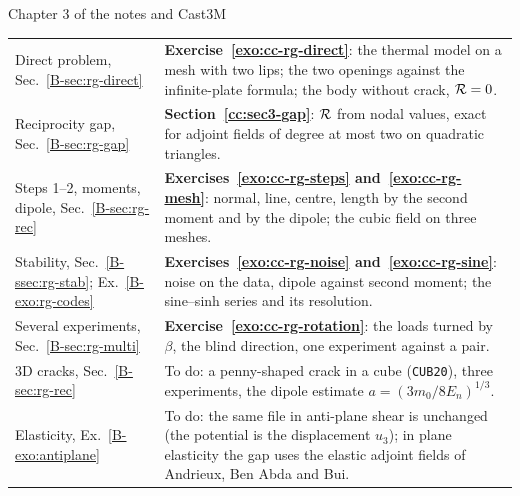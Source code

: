 \begin{gbox}{Chapter 3 of the notes and Cast3M}\label{cc:tab3}
\small
\begin{tabular}{@{}p{42mm}@{\hspace{3mm}}p{98mm}@{}}
Direct problem, Sec.~\ref{B-sec:rg-direct}
 & \textbf{Exercise~\ref{exo:cc-rg-direct}}: the thermal model on a mesh with
   two lips; the two openings against the infinite-plate formula; the body
   without crack, $\mathcal{R}=0$.\\[1mm]
Reciprocity gap, Sec.~\ref{B-sec:rg-gap}
 & \textbf{Section~\ref{cc:sec3-gap}}: $\mathcal{R}$ from nodal values, exact for
   adjoint fields of degree at most two on quadratic triangles.\\[1mm]
Steps 1--2, moments, dipole, Sec.~\ref{B-sec:rg-rec}
 & \textbf{Exercises~\ref{exo:cc-rg-steps} and~\ref{exo:cc-rg-mesh}}: normal,
   line, centre, length by the second moment and by the dipole; the cubic
   field on three meshes.\\[1mm]
Stability, Sec.~\ref{B-ssec:rg-stab}; Ex.~\ref{B-exo:rg-codes}
 & \textbf{Exercises~\ref{exo:cc-rg-noise} and~\ref{exo:cc-rg-sine}}: noise on
   the data, dipole against second moment; the sine--sinh series and its
   resolution.\\[1mm]
Several experiments, Sec.~\ref{B-sec:rg-multi}
 & \textbf{Exercise~\ref{exo:cc-rg-rotation}}: the loads turned by $\beta$,
   the blind direction, one experiment against a pair.\\[1mm]
3D cracks, Sec.~\ref{B-sec:rg-rec}
 & To do: a penny-shaped crack in a cube (\texttt{CUB20}), three experiments,
   the dipole estimate $a=(3m_0/8E_n)^{1/3}$.\\[1mm]
Elasticity, Ex.~\ref{B-exo:antiplane}
 & To do: the same file in anti-plane shear is unchanged (the potential is the
   displacement $u_3$); in plane elasticity the gap uses the elastic adjoint
   fields of Andrieux, Ben Abda and Bui.\\
\end{tabular}
\end{gbox}

